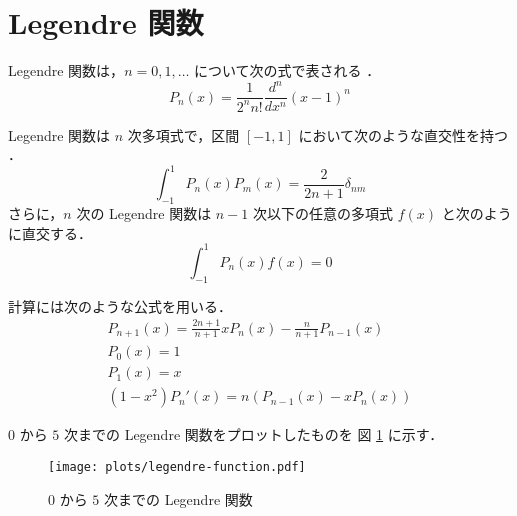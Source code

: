 %

\section{Legendre 関数}\label{sec:special-function_legendre-function}

Legendre 関数は，$n=0,1,\ldots$ について次の式で表される
\cite[Section 5.2]{Morse1953}．
\begin{equation}
    P_n(x) = \frac{1}{2^n n!} \frac{d^n}{dx^n} (x - 1)^n
\end{equation}

Legendre 関数は $n$ 次多項式で，区間 $[-1, 1]$ において次のような直交性を持つ
\cite[Section 6.3]{Morse1953}．
\begin{equation}
    \int_{-1}^{1} P_n(x) P_m(x) = \frac{2}{2n + 1} \delta_{nm}
\end{equation}
さらに，$n$ 次の Legendre 関数は $n-1$ 次以下の任意の多項式 $f(x)$ と次のように直交する．
\begin{equation}
    \int_{-1}^{1} P_n(x) f(x) = 0
\end{equation}

計算には次のような公式を用いる\cite[Section6.3]{Morse1953}．
\begin{gather}
    P_{n+1}(x) = \frac{2n+1}{n+1} x P_n(x) - \frac{n}{n+1} P_{n-1}(x) \\
    P_0(x) = 1 \\
    P_1(x) = x \\
    (1-x^2) P_n'(x) = n(P_{n-1}(x) - x P_n(x))
\end{gather}

$0$ から $5$ 次までの Legendre 関数をプロットしたものを
図 \ref{fig:special-function_legendre-function} に示す．

\begin{figure}[tp]
    \centering
    \texttt{[image: plots/legendre-function.pdf]}
    \caption{$0$ から $5$ 次までの Legendre 関数}
    \label{fig:special-function_legendre-function}
\end{figure}
